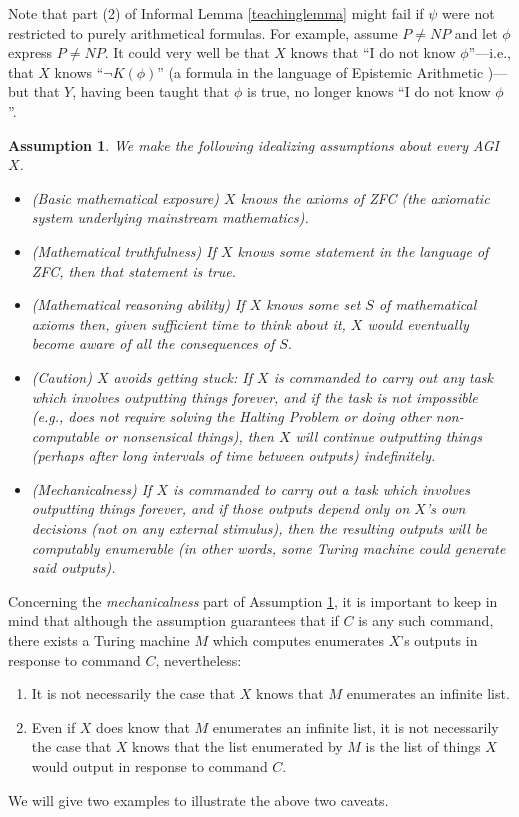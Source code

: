 \documentclass{article}
\newtheorem{assumption}[theorem]{Assumption}
\begin{document}
Note that part (2) of Informal Lemma \ref{teachinglemma} might fail if
$\psi$ were not restricted to purely arithmetical formulas.
For example, assume $P\neq NP$ and let $\phi$ express $P\neq NP$.
It could very well be that $X$ knows that ``I do not know $\phi$''---i.e., that
$X$ knows ``$\neg K(\phi)$'' (a formula in the language of Epistemic Arithmetic
\cite{shapiro})---but that $Y$, having been taught that $\phi$ is true,
no longer knows ``I do not know $\phi$''.

\begin{assumption}
\label{idealizingassumption}
    We make the following idealizing assumptions about every AGI $X$.
    \begin{itemize}
        \item
        (Basic mathematical exposure) $X$ knows the axioms of ZFC (the axiomatic
        system underlying mainstream mathematics).
        \item
        (Mathematical truthfulness) If $X$ knows some statement in the language
        of ZFC, then that statement is true.
        \item
        (Mathematical reasoning ability) If $X$ knows some set $S$ of mathematical
        axioms then, given sufficient time to think about it, $X$ would eventually
        become aware of all the consequences of $S$.
        \item
        (Caution) $X$ avoids getting stuck: If $X$ is commanded to carry out any
        task which involves outputting things
        forever, and if the task is not impossible
        (e.g., does not require solving the Halting Problem or doing other
        non-computable or nonsensical things),
        then $X$ will continue outputting things (perhaps
        after long intervals of time between outputs) indefinitely.
        \item
        (Mechanicalness) If $X$ is commanded to carry out a task
        which involves outputting things forever, and if those outputs depend only on
        $X$'s own decisions (not on any external stimulus),
        then the resulting outputs will
        be computably enumerable (in other words, some Turing machine could
        generate said outputs).
    \end{itemize}
\end{assumption}

Concerning the \emph{mechanicalness} part of Assumption \ref{idealizingassumption},
it is important to keep in mind that although the assumption guarantees that if $C$
is any such command, there exists a Turing machine $M$ which computes enumerates
$X$'s outputs in response to command $C$, nevertheless:
\begin{enumerate}
    \item
    It is not necessarily the case that $X$ knows that $M$
    enumerates an infinite list.
    \item
    Even if $X$ does know that $M$ enumerates an infinite list, it is not necessarily
    the case that $X$ knows that the list enumerated by $M$ is the list of things
    $X$ would output in response to command $C$.
\end{enumerate}
We will give two examples to illustrate the above two caveats.
\end{document}
